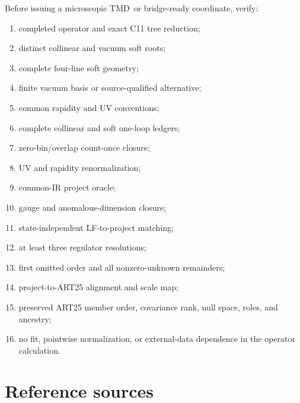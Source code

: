 \documentclass[11pt]{article}
\newcommand{\TMD}{\ensuremath{\mathrm{TMD}}}
\begin{document}
Before issuing a microscopic \TMD\ or bridge-ready coordinate, verify:
\begin{enumerate}
\item completed operator and exact C11 tree reduction;
\item distinct collinear and vacuum soft roots;
\item complete four-line soft geometry;
\item finite vacuum basis or source-qualified alternative;
\item common rapidity and UV conventions;
\item complete collinear and soft one-loop ledgers;
\item zero-bin/overlap count-once closure;
\item UV and rapidity renormalization;
\item common-IR project oracle;
\item gauge and anomalous-dimension closure;
\item state-independent LF-to-project matching;
\item at least three regulator resolutions;
\item first omitted order and all nonzero-unknown remainders;
\item project-to-ART25 alignment and scale map;
\item preserved ART25 member order, covariance rank, null space, roles, and ancestry;
\item no fit, pointwise normalization, or external-data dependence in the operator calculation.
\end{enumerate}

\section{Reference sources}
\label{app:references}
\end{document}
